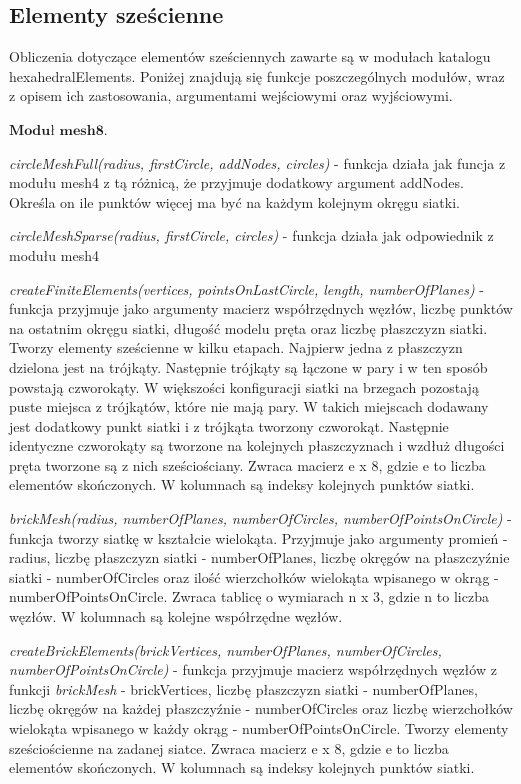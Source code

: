 \subsection{Elementy sześcienne}
\label{cha:elementy szescienne}

Obliczenia dotyczące elementów sześciennych zawarte są w modułach katalogu hexahedralElements. Poniżej znajdują się funkcje poszczególnych modułów, wraz z opisem ich zastosowania, argumentami wejściowymi oraz wyjściowymi.

 \( \textbf{Moduł mesh8} \).

\textit{circleMeshFull(radius, firstCircle, addNodes, circles)} - funkcja działa jak funcja z modułu mesh4 z tą różnicą, że przyjmuje dodatkowy argument addNodes. Określa on ile punktów więcej ma być na każdym kolejnym okręgu siatki.

\textit{circleMeshSparse(radius, firstCircle, circles)} - funkcja działa jak odpowiednik z modułu mesh4

\textit{createFiniteElements(vertices, pointsOnLastCircle, length, numberOfPlanes)} - funkcja przyjmuje jako argumenty macierz współrzędnych węzłów, liczbę punktów na ostatnim okręgu siatki, długość modelu pręta oraz liczbę płaszczyzn siatki. Tworzy elementy sześcienne w kilku etapach. Najpierw jedna z płaszczyzn dzielona jest na trójkąty. Następnie trójkąty są łączone w pary i w ten sposób powstają czworokąty. W większości konfiguracji siatki na brzegach pozostają puste miejsca z trójkątów, które nie mają pary. W takich miejscach dodawany jest dodatkowy punkt siatki i z trójkąta tworzony czworokąt. Następnie identyczne czworokąty są tworzone na kolejnych płaszczyznach i wzdłuż długości pręta tworzone są z nich sześciościany. Zwraca macierz e x 8, gdzie e to liczba elementów skończonych. W kolumnach są indeksy kolejnych punktów siatki.

\textit{brickMesh(radius, numberOfPlanes, numberOfCircles, numberOfPointsOnCircle)} - funkcja tworzy siatkę w kształcie wielokąta. Przyjmuje jako argumenty promień - radius, liczbę płaszczyzn siatki - numberOfPlanes, liczbę okręgów na płaszczyźnie siatki - numberOfCircles oraz ilość wierzchołków wielokąta wpisanego w okrąg - numberOfPointsOnCircle. Zwraca tablicę o wymiarach n x 3, gdzie n to liczba węzłów. W kolumnach są kolejne współrzędne węzłów.

\textit{createBrickElements(brickVertices, numberOfPlanes, numberOfCircles, numberOfPointsOnCircle)} - funkcja przyjmuje macierz współrzędnych węzłów z funkcji \textit{brickMesh} - brickVertices, liczbę płaszczyzn siatki - numberOfPlanes, liczbę okręgów na każdej płaszczyźnie - numberOfCircles oraz liczbę wierzchołków wielokąta wpisanego w każdy okrąg - numberOfPointsOnCircle. Tworzy elementy sześciościenne na zadanej siatce. Zwraca macierz e x 8, gdzie e to liczba elementów skończonych. W kolumnach są indeksy kolejnych punktów siatki.

